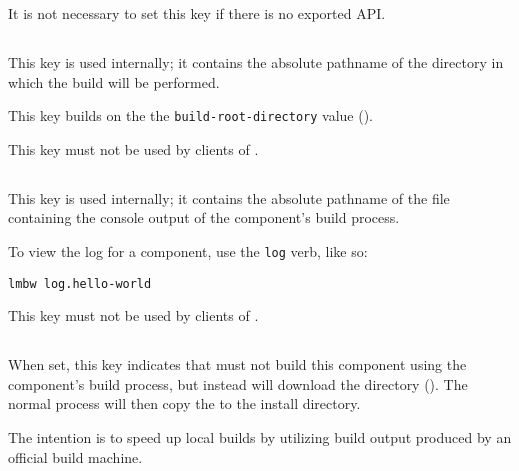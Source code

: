 It is not necessary to set this key if there is no exported API.


\subsection{}\label{variables:build-directory}

This key is used internally; it contains the absolute pathname of the
directory in which the build will be performed.

This key builds on the the \texttt{build-root-directory} value
().

This key must not be used by clients of \lmsbw.


\subsection{}\label{variables:build-log}

This key is used internally; it contains the absolute pathname of the
file containing the console output of the component's build process.

To view the log for a component, use the \texttt{log} verb, like so:

\begin{verbatim}
lmbw log.hello-world
\end{verbatim}

This key must not be used by clients of \lmsbw.


\subsection{}
\label{variables:build-output-download}

When set, this key indicates that \lmsbw must not build this component
using the component's build process, but instead will download the
\destdir directory ().  The normal
\lmsbw process will then copy the \destdir to the install directory.

The intention is to speed up local builds by utilizing build output
produced by an official build machine.

